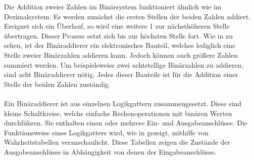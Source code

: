 Die Addition zweier Zahlen im Binärsystem funktioniert ähnlich wie im Dezimalsystem. Es werden zunächst die ersten Stellen der beiden Zahlen addiert. Ereignet sich ein Überlauf, so wird eine weitere 1 zur nächsthöheren Stelle übertragen. Dieser Prozess setzt sich bis zur höchsten Stelle fort. Wie in \cite{zimmermann1998binary} zu sehen, ist der Binäraddierer ein elektronisches Bauteil, welches lediglich eine Stelle zweier Binärzahlen addieren kann. Jedoch können auch größere Zahlen summiert werden. Um beispielsweise zwei achtstellige Binärzahlen zu addieren, sind acht Binäraddierer nötig. Jedes dieser Bauteile ist für die Addition einer Stelle der beiden Zahlen zuständig.\\\\
Ein Binäraddierer ist aus einzelnen Logikgattern zusammengesetzt. Diese sind kleine Schaltkreise, welche einfache Rechenoperationen mit binären Werten durchführen. Sie enthalten einen oder mehrere Ein- und Ausgabeanschlüsse. Die Funktionsweise eines Logikgatters wird, wie in \cite{rigotti2003digitale} gezeigt, mithilfe von Wahrheitstabellen veranschaulicht. Diese Tabellen zeigen die Zustände der Ausgabeanschlüsse in Abhängigkeit von denen der Eingabeanschlüsse.

